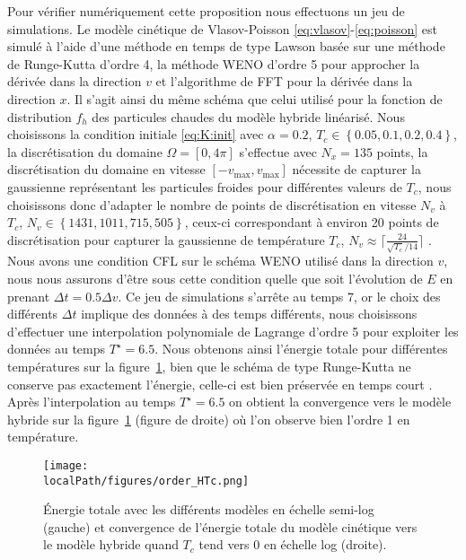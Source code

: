Pour vérifier numériquement cette proposition nous effectuons un jeu de simulations. Le modèle cinétique de Vlasov-Poisson \eqref{eq:vlasov}-\eqref{eq:poisson} est simulé à l'aide d'une méthode en temps de type Lawson basée sur une méthode de Runge-Kutta d'ordre 4, la méthode WENO d'ordre 5 pour approcher la dérivée dans la direction $v$ et l'algorithme de FFT pour la dérivée dans la direction $x$. Il s'agit ainsi du même schéma que celui utilisé pour la fonction de distribution $f_h$ des particules chaudes du modèle hybride linéarisé. Nous choisissons la condition initiale \eqref{eq:K:init} avec $\alpha = 0.2$, $T_c \in \left\{ 0.05,0.1,0.2,0.4\right\}$, la discrétisation du domaine $\Omega = [0,4\pi]$ s'effectue avec $N_x = 135$ points, la discrétisation du domaine en vitesse $[-v_{\text{max}},v_{\text{max}}]$ nécessite de capturer la gaussienne représentant les particules froides pour différentes valeurs de $T_c$, nous choisissons donc d'adapter le nombre de points de discrétisation en vitesse $N_v$ à $T_c$, $N_v \in \left\{ 1431,1011,715,505 \right\}$, ceux-ci correspondant à environ 20 points de discrétisation pour capturer la gaussienne de température $T_c$, $N_v \approx \lceil \frac{24}{{\sqrt{T_c}}/{14}} \rceil$ . Nous avons une condition CFL sur le schéma WENO utilisé dans la direction $v$, nous nous assurons d'être sous cette condition quelle que soit l'évolution de $E$ en prenant $\Delta t = 0.5\Delta v$. Ce jeu de simulations s'arrête au temps 7, or le choix des différents $\Delta t$ implique des données à des temps différents, nous choisissons d'effectuer une interpolation polynomiale de Lagrange d'ordre 5 pour exploiter les données au temps $T^\star = 6.5$. Nous obtenons ainsi l'énergie totale pour différentes températures sur la figure~\ref{fig:limit:totalenergy}, bien que le schéma de type Runge-Kutta ne conserve pas exactement l'énergie, celle-ci est bien préservée en temps court . Après l'interpolation au temps $T^\star = 6.5$ on obtient la convergence vers le modèle hybride sur la figure~\ref{fig:limit:totalenergy} (figure de droite) où l'on observe bien l'ordre 1 en température.
\begin{figure}[h]
  \centering
  \texttt{[image: \\localPath/figures/order\_HTc.png]}
  \caption{Énergie totale avec les différents modèles en échelle semi-log (gauche) et convergence de l'énergie totale du modèle cinétique vers le modèle hybride quand $T_c$ tend vers $0$ en échelle log (droite).}
  \label{fig:limit:totalenergy}
\end{figure}

